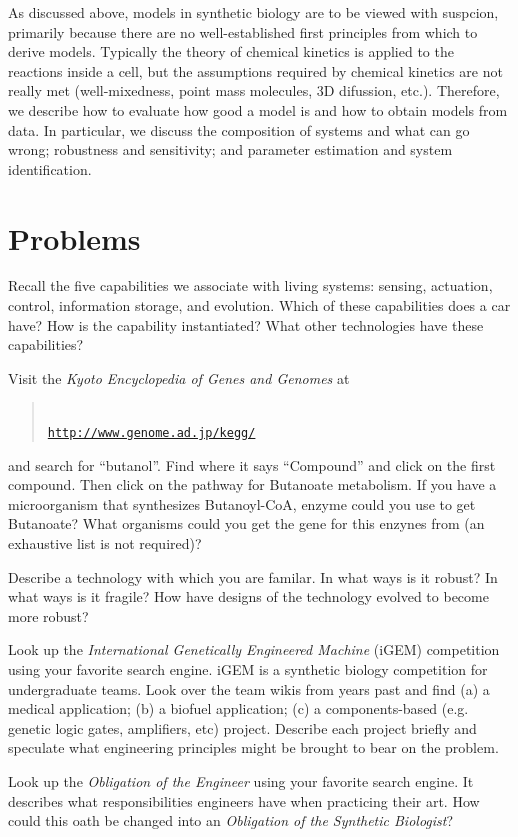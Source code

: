 As discussed above, models in synthetic biology are to be viewed with
suspcion, primarily because there are no well-established first
principles from which to derive models. Typically the theory of
chemical kinetics is applied to the reactions inside a cell, but the
assumptions required by chemical kinetics are not really met
(well-mixedness, point mass molecules, 3D difussion, etc.). Therefore,
we describe how to evaluate how good a model is and how to obtain
models from data. In particular, we discuss the composition of systems
and what can go wrong; robustness and sensitivity; and parameter
estimation and system identification.

\section{Problems}

\begin{exercise}
  Recall the five capabilities we associate with living systems:
  sensing, actuation, control, information storage, and
  evolution. Which of these capabilities does a car have? How is the
  capability instantiated? What other technologies have these
  capabilities?
\end{exercise}

\begin{exercise}
  Visit the {\em Kyoto Encyclopedia of Genes and Genomes} at
\begin{quote}
  \ \\
  \href{http://www.genome.ad.jp/kegg/}{\tt http://www.genome.ad.jp/kegg/}
  \ \\
\end{quote}
  and search for ``butanol''. Find where
  it says ``Compound'' and click on the first compound. Then click on
  the pathway for Butanoate metabolism. If you have a microorganism
  that synthesizes Butanoyl-CoA, enzyme could you use to
  get Butanoate? What organisms could you get the gene for this
  enzynes from (an exhaustive list is not required)?
\end{exercise}

\begin{exercise}
  Describe a technology with which you are familar. In what ways is it
  robust? In what ways is it fragile? How have designs of the
  technology evolved to become more robust? 
\end{exercise}

\begin{exercise}
  Look up the {\em International Genetically Engineered Machine}
  (iGEM) competition using your favorite search engine. iGEM is a
  synthetic biology competition for undergraduate teams. Look over the
  team wikis from years past and find (a) a medical application; (b) a
  biofuel application; (c) a components-based (e.g. genetic logic
  gates, amplifiers, etc) project. Describe each project briefly and
  speculate what engineering principles might be brought to bear on
  the problem.
\end{exercise}

\begin{exercise}
  Look up the {\em Obligation of the Engineer} using your favorite
  search engine. It describes what responsibilities engineers have
  when practicing their art. How could this oath be changed into an
  {\em Obligation of the Synthetic Biologist}?
\end{exercise}